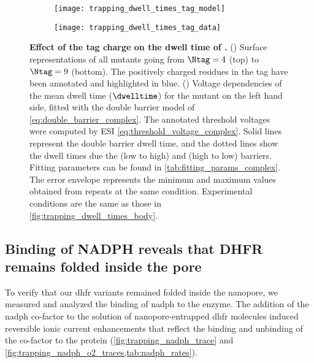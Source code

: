 %
\begin{figure*}[p]
  \centering

	\begin{subfigure}[t]{4.5cm}
		\centering
		\caption{}\vspace{-5mm}\label{fig:trapping_dwell_times_tag_model}
    \texttt{[image: trapping\_dwell\_times\_tag\_model]}
  \end{subfigure}
  \begin{subfigure}[t]{6.5cm}
		\centering
		\caption{}\vspace{-3mm}\label{fig:trapping_dwell_times_tag_data}
    \texttt{[image: trapping\_dwell\_times\_tag\_data]}
  \end{subfigure}

	\caption[Effect of the tag charge on the dwell time of .]{%
    \textbf{Effect of the tag charge on the dwell time of .}
    ()
    Surface representations of all  mutants going from $\Ntag=4$ (top) to $\Ntag=9$
    (bottom). The positively charged residues in the tag have been annotated and highlighted in blue.
    ()
    Voltage dependencies of the mean dwell time ($\dwelltime$) for the mutant on the left hand side, fitted
    with the double barrier model of \cref{eq:double_barrier_complex}. The annotated threshold voltages were
    computed by ESI \cref{eq:threshold_voltage_complex}. Solid lines represent the double barrier dwell time,
    and the dotted lines show the dwell times due the \cisi{} (low to high) and \transi{} (high to low)
    barriers. Fitting parameters can be found in \cref{tab:fitting_params_complex}. The error envelope
    represents the minimum and maximum values obtained from repeats at the same condition. Experimental
    conditions are the same as those in \cref{fig:trapping_dwell_times_body}.
  }\label{fig:trapping_dwell_times_tag}
\end{figure*}
%

\subsection{Binding of {NADPH} reveals that {DHFR} remains folded inside the pore}
%

To verify that our \gls{dhfr} variants remained folded inside the nanopore, we measured and analyzed the
binding of \gls{nadph} to the enzyme. The addition of the \gls{nadph} co-factor to the \transi{} solution of
nanopore-entrapped \gls{dhfr} molecules induced reversible ionic current enhancements that reflect the binding
and unbinding of the co-factor to the protein (\cref{fig:trapping_nadph_trace} and
\cref{fig:trapping_nadph_o2_traces,tab:nadph_rates}).

